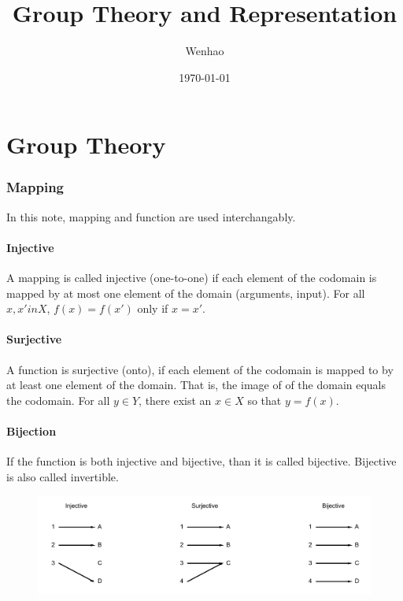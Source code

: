 \documentclass{amsart}
\theoremstyle{remark}
\theoremstyle{remark}
\theoremstyle{definition}
\begin{document}
\title{Group Theory and Representation}
\author{Wenhao}
\date{\today}
\maketitle

\part{Group Theory}

\section*{Mapping}
In this note, mapping and function are used interchangably. 
\subsection*{Injective}
A mapping is called injective (one-to-one) if each element of the codomain is mapped by 
at most one element of the domain (arguments, input). 
For all $x,x' in X$, $f(x)=f(x')$ only if $x=x'$.

\subsection*{Surjective}
A function is surjective (onto), if each element of the codomain is mapped to by at least one element of 
the domain. That is, the image of of the domain equals the codomain. 
For all $y\in Y$, there exist an $x\in X$ so that $y=f(x)$.

\subsection*{Bijection}
If the function is both injective and bijective, than it is called bijective. Bijective is also called invertible.

\begin{figure}[h!]
    \centering
    \includegraphics[width = 5in]{figures/mapping.png}
\end{figure}
\end{document}
